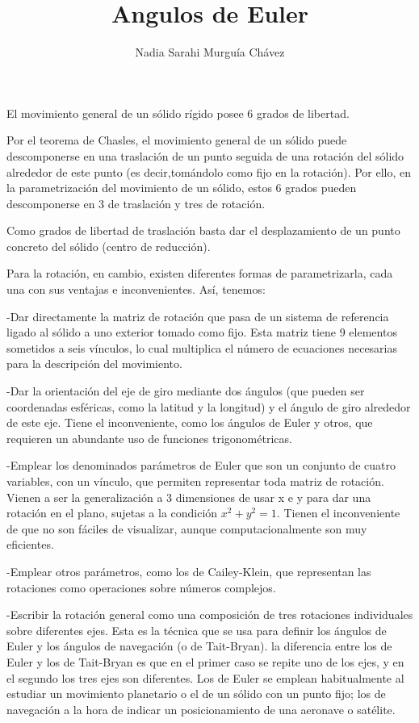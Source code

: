 \documentclass[12pt,a4paper]{report}
\author{Nadia Sarahi Murgu\'ia Ch\'avez}
\title{Angulos de Euler}
\begin{document}
\maketitle
El movimiento general de un sólido rígido posee 6 grados de libertad.

Por el teorema de Chasles, el movimiento general de un sólido puede descomponerse en una traslación de un punto seguida de una rotación del sólido alrededor de este punto (es decir,tomándolo como fijo en la rotación). Por ello, en la parametrización del movimiento de un sólido, estos 6 grados pueden descomponerse en 3 de traslación y tres de rotación.

Como grados de libertad de traslación basta dar el desplazamiento de un punto concreto del sólido (centro de reducción).

Para la rotación, en cambio, existen diferentes formas de parametrizarla, cada una con sus ventajas e inconvenientes. Así, tenemos:

-Dar directamente la matriz de rotación que pasa de un sistema de referencia ligado al sólido a uno exterior tomado como fijo. Esta matriz tiene 9 elementos sometidos a seis vínculos, lo cual multiplica el número de ecuaciones necesarias para la descripción del movimiento.

-Dar la orientación del eje de giro mediante dos ángulos (que pueden ser coordenadas esféricas, como la latitud y la longitud) y el ángulo de giro alrededor de este eje. Tiene el inconveniente, como los ángulos de Euler y otros, que requieren un abundante uso de funciones trigonométricas.

-Emplear los denominados parámetros de Euler que son un conjunto de cuatro variables, con un vínculo, que permiten representar toda matriz de rotación. Vienen a ser la generalización a 3 dimensiones de usar x e y para dar una rotación en el plano, sujetas a la condición $x^{2}+y^{2}=1$. Tienen el inconveniente de que no son fáciles de visualizar, aunque computacionalmente son muy eficientes.

-Emplear otros parámetros, como los de Cailey-Klein, que representan las rotaciones como operaciones sobre números complejos.

-Escribir la rotación general como una composición de tres rotaciones individuales sobre diferentes ejes. Esta es la técnica que se usa para definir los ángulos de Euler y los ángulos de navegación (o de Tait-Bryan). la diferencia entre los de Euler y los de Tait-Bryan es que en el primer caso se repite uno de los ejes, y en el segundo los tres ejes son diferentes. Los de Euler se emplean habitualmente al estudiar un movimiento planetario o el de un sólido con un punto fijo; los de navegación a la hora de indicar un posicionamiento de una aeronave o satélite.
\end{document}
